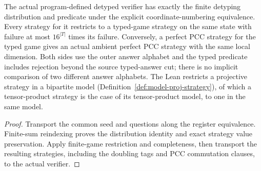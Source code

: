 \begin{lemma}
\label{lem:detype-program-strategies}
\leanok
The actual program-defined detyped verifier has exactly the finite detyping
distribution and predicate under the explicit coordinate-numbering equivalence.
Every strategy for it restricts to a typed-game strategy on the same state
with failure at most $16^{|T|}$ times its failure. Conversely, a perfect PCC
strategy for the typed game gives an actual ambient perfect PCC strategy
with the same local dimension. Both sides use the outer answer alphabet and
the typed predicate includes rejection beyond the source typed-answer cut;
there is no implicit comparison of two different answer alphabets.
The Lean restricts a projective strategy in a bipartite model
(Definition~\ref{def:model-proj-strategy}), of which a tensor-product strategy is the case of its
tensor-product model, to one in the same model.
\end{lemma}
\begin{proof}
\leanok
Transport the common seed and questions along the register equivalence.
Finite-sum reindexing proves the distribution identity and exact strategy
value preservation. Apply finite-game restriction and completeness, then
transport the resulting strategies, including the doubling tags and PCC
commutation clauses, to the actual verifier.
\end{proof}

